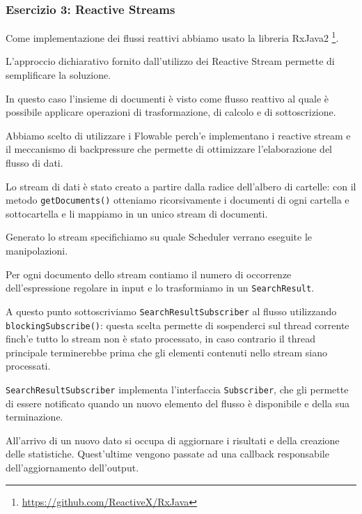 \documentclass[a4paper]{article}
\begin{document}
\subsubsection{Esercizio 3: Reactive Streams}

Come implementazione dei flussi reattivi abbiamo usato la libreria RxJava2 \footnote{\url{https://github.com/ReactiveX/RxJava}}.

L'approccio dichiarativo fornito dall'utilizzo dei Reactive Stream permette di semplificare la soluzione.

In questo caso l'insieme di documenti \`e visto come flusso reattivo al quale \`e possibile applicare operazioni di trasformazione, di calcolo e di sottoscrizione.
%

Abbiamo scelto di utilizzare i Flowable perch'e implementano i reactive stream e il meccanismo di backpressure che permette di ottimizzare l'elaborazione del flusso di dati.

Lo stream di dati \`e stato creato a partire dalla radice dell'albero di cartelle: con il metodo \texttt{getDocuments()} otteniamo ricorsivamente i documenti di ogni cartella e sottocartella e li mappiamo in un unico stream di documenti.

Generato lo stream specifichiamo su quale Scheduler verrano eseguite le manipolazioni.

Per ogni documento dello stream contiamo il numero di occorrenze dell'espressione regolare in input e lo trasformiamo in un \texttt{SearchResult}.

A questo punto sottoscriviamo \texttt{SearchResultSubscriber} al flusso utilizzando \texttt{blockingSubscribe()}: questa scelta permette di sospenderci sul thread corrente finch'e tutto lo stream non \`e stato processato, in caso contrario il thread principale terminerebbe prima che gli elementi contenuti nello stream siano processati.

\texttt{SearchResultSubscriber} implementa l'interfaccia \texttt{Subscriber}, che gli permette di essere notificato quando un nuovo elemento del flusso \`e disponibile e della sua terminazione.

All'arrivo di un nuovo dato si occupa di aggiornare i risultati e della creazione delle statistiche.
%
Quest'ultime vengono passate ad una callback responsabile dell'aggiornamento dell'output.
\end{document}
